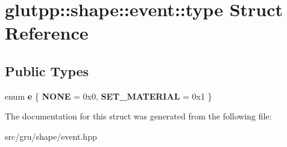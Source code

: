\hypertarget{structglutpp_1_1shape_1_1event_1_1type}{\section{glutpp\-:\-:shape\-:\-:event\-:\-:type \-Struct \-Reference}
\label{structglutpp_1_1shape_1_1event_1_1type}
}
\subsection*{\-Public \-Types}
\begin{DoxyCompactItemize}
\item 
enum {\bfseries e} \{ {\bfseries \-N\-O\-N\-E} =  0x0, 
{\bfseries \-S\-E\-T\-\_\-\-M\-A\-T\-E\-R\-I\-A\-L} =  0x1
 \}
\end{DoxyCompactItemize}


\-The documentation for this struct was generated from the following file\-:\begin{DoxyCompactItemize}
\item 
src/gru/shape/event.\-hpp\end{DoxyCompactItemize}
